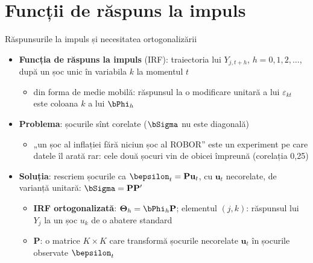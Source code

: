 \section{Funcții de răspuns la impuls}

\begin{frame}{Răspunsurile la impuls și necesitatea ortogonalizării}
\itemsize{\small}
\begin{itemize}
    \item \textbf{Funcția de răspuns la impuls} (IRF): traiectoria lui $Y_{j,t+h}$, $h = 0, 1, 2, \dots$, după un șoc unic în variabila $k$ la momentul $t$
    \begin{itemize}
        \item din forma de medie mobilă: răspunsul la o modificare unitară a lui $\varepsilon_{kt}$ este coloana $k$ a lui $\bPhi_h$
    \end{itemize}
    \item \textbf{Problema}: șocurile sînt corelate ($\bSigma$ nu este diagonală)
    \begin{itemize}
        \item „un șoc al inflației fără niciun șoc al ROBOR” este un experiment pe care datele îl arată rar: cele două șocuri vin de obicei împreună (corelația 0{,}25)
    \end{itemize}
    \item \textbf{Soluția}: rescriem șocurile ca $\bepsilon_t = \mathbf{P}\mathbf{u}_t$, cu $\mathbf{u}_t$ necorelate, de varianță unitară: $\bSigma = \mathbf{P}\mathbf{P}'$
    \begin{itemize}
        \item \textbf{IRF ortogonalizată}: $\boldsymbol{\Theta}_h = \bPhi_h\mathbf{P}$; elementul $(j, k)$: răspunsul lui $Y_j$ la un șoc $u_k$ de o abatere standard
        \item $\mathbf{P}$: o matrice $K \times K$ care transformă șocurile necorelate $\mathbf{u}_t$ în șocurile observate $\bepsilon_t$
    \end{itemize}
\end{itemize}
\end{frame}

